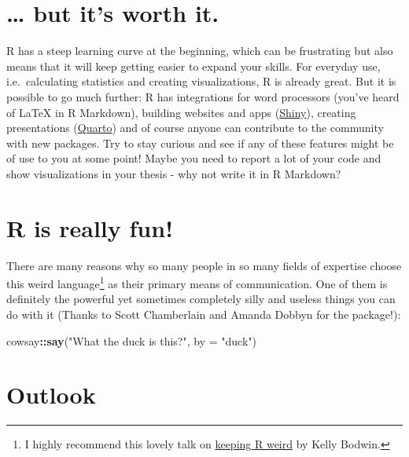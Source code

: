 \documentclass[
]{book}
\newenvironment{Shaded}{\begin{snugshade}}{\end{snugshade}}
\newcommand{\AttributeTok}[1]{\textcolor[rgb]{0.13,0.29,0.53}{#1}}
\newcommand{\FunctionTok}[1]{\textcolor[rgb]{0.13,0.29,0.53}{\textbf{#1}}}
\newcommand{\NormalTok}[1]{#1}
\newcommand{\SpecialCharTok}[1]{\textcolor[rgb]{0.81,0.36,0.00}{\textbf{#1}}}
\newcommand{\StringTok}[1]{\textcolor[rgb]{0.31,0.60,0.02}{#1}}
\begin{document}
\section*{\ldots{} but it's worth it.}\label{but-its-worth-it.}

R has a steep learning curve at the beginning, which can be frustrating but also means that it will keep getting easier to expand your skills.
For everyday use, i.e.~calculating statistics and creating visualizations, R is already great.
But it is possible to go much further: R has integrations for word processors (you've heard of LaTeX in R Markdown), building websites and apps (\href{https://shiny.posit.co/r/getstarted/shiny-basics/lesson1/index.html}{Shiny}), creating presentations (\href{https://quarto.org/docs/get-started/hello/rstudio.html}{Quarto}) and of course anyone can contribute to the community with new packages.
Try to stay curious and see if any of these features might be of use to you at some point!
Maybe you need to report a lot of your code and show visualizations in your thesis - why not write it in R Markdown?

\section*{R is really fun!}\label{r-is-really-fun}

There are many reasons why so many people in so many fields of expertise choose this weird language\footnote{I highly recommend this lovely talk on \href{https://youtu.be/KOQBfC1WPwM?si=M_eStpWXBf56UGy7}{keeping R weird} by Kelly Bodwin.} as their primary means of communication.
One of them is definitely the powerful yet sometimes completely silly and useless things you can do with it (Thanks to Scott Chamberlain and Amanda Dobbyn for the package!):

\begin{Shaded}
\begin{Highlighting}[]
\NormalTok{cowsay}\SpecialCharTok{::}\FunctionTok{say}\NormalTok{(}\StringTok{"What the duck is this?"}\NormalTok{, }\AttributeTok{by =} \StringTok{"duck"}\NormalTok{)}
\end{Highlighting}
\end{Shaded}

\section*{Outlook}\label{outlook}
\end{document}
